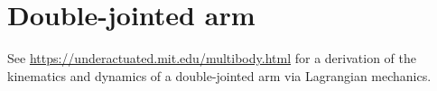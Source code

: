 \section{Double-jointed arm}

See \url{https://underactuated.mit.edu/multibody.html} for a derivation of the
kinematics and dynamics of a double-jointed arm via Lagrangian mechanics.
